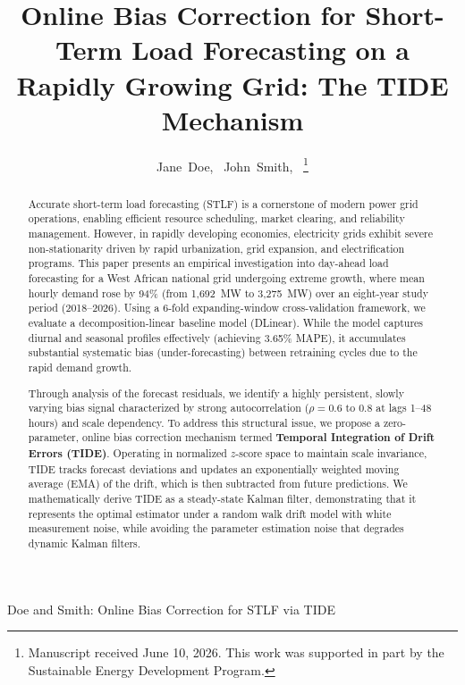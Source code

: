 \documentclass[journal]{IEEEtran}
\begin{document}
\title{Online Bias Correction for Short-Term Load Forecasting on a Rapidly Growing Grid: The TIDE Mechanism}

\author{Jane~Doe,~
        John~Smith,~%
\thanks{Manuscript received June 10, 2026. This work was supported in part by the Sustainable Energy Development Program.}}

%
{Doe and Smith: Online Bias Correction for STLF via TIDE}

\maketitle

\begin{abstract}
Accurate short-term load forecasting (STLF) is a cornerstone of modern power grid operations, enabling efficient resource scheduling, market clearing, and reliability management. However, in rapidly developing economies, electricity grids exhibit severe non-stationarity driven by rapid urbanization, grid expansion, and electrification programs. This paper presents an empirical investigation into day-ahead load forecasting for a West African national grid undergoing extreme growth, where mean hourly demand rose by 94\% (from 1,692~MW to 3,275~MW) over an eight-year study period (2018--2026). Using a 6-fold expanding-window cross-validation framework, we evaluate a decomposition-linear baseline model (DLinear). While the model captures diurnal and seasonal profiles effectively (achieving 3.65\% MAPE), it accumulates substantial systematic bias (under-forecasting) between retraining cycles due to the rapid demand growth.

Through analysis of the forecast residuals, we identify a highly persistent, slowly varying bias signal characterized by strong autocorrelation ($\rho = 0.6$ to $0.8$ at lags 1--48 hours) and scale dependency. To address this structural issue, we propose a zero-parameter, online bias correction mechanism termed \textbf{Temporal Integration of Drift Errors (TIDE)}. Operating in normalized $z$-score space to maintain scale invariance, TIDE tracks forecast deviations and updates an exponentially weighted moving average (EMA) of the drift, which is then subtracted from future predictions. We mathematically derive TIDE as a steady-state Kalman filter, demonstrating that it represents the optimal estimator under a random walk drift model with white measurement noise, while avoiding the parameter estimation noise that degrades dynamic Kalman filters.


\end{abstract}
\end{document}
